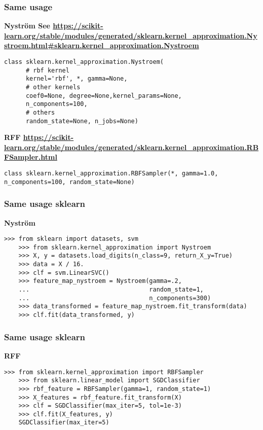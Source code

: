 \begin{frame}[fragile]
  \frametitle{Same usage}
\bf{Nyström} {\tiny See \url{https://scikit-learn.org/stable/modules/generated/sklearn.kernel\_approximation.Nystroem.html#sklearn.kernel_approximation.Nystroem}}
  \begin{lstlisting}[style=PythonStyle]
    class sklearn.kernel_approximation.Nystroem(
      # rbf kernel
      kernel='rbf', *, gamma=None, 
      # other kernels
      coef0=None, degree=None,kernel_params=None,
      n_components=100,
      # others
      random_state=None, n_jobs=None)
  \end{lstlisting}

  \bf{RFF}{ \tiny \url{https://scikit-learn.org/stable/modules/generated/sklearn.kernel_approximation.RBFSampler.html}}
  \begin{lstlisting}[style=PythonStyle]
    class sklearn.kernel_approximation.RBFSampler(*, gamma=1.0, n_components=100, random_state=None)
  \end{lstlisting}


\end{frame}


\begin{frame}[fragile]
  \frametitle{Same usage sklearn}
\bf{Nyström} 
  \begin{lstlisting}[style=PythonStyle]
    >>> from sklearn import datasets, svm
    >>> from sklearn.kernel_approximation import Nystroem
    >>> X, y = datasets.load_digits(n_class=9, return_X_y=True)
    >>> data = X / 16.
    >>> clf = svm.LinearSVC()
    >>> feature_map_nystroem = Nystroem(gamma=.2,
    ...                                 random_state=1,
    ...                                 n_components=300)
    >>> data_transformed = feature_map_nystroem.fit_transform(data)
    >>> clf.fit(data_transformed, y)
  \end{lstlisting}


\end{frame}

\begin{frame}[fragile]
  \frametitle{Same usage sklearn}

  \bf{RFF}
  \begin{lstlisting}[style=PythonStyle]
    >>> from sklearn.kernel_approximation import RBFSampler
    >>> from sklearn.linear_model import SGDClassifier
    >>> rbf_feature = RBFSampler(gamma=1, random_state=1)
    >>> X_features = rbf_feature.fit_transform(X)
    >>> clf = SGDClassifier(max_iter=5, tol=1e-3)
    >>> clf.fit(X_features, y)
    SGDClassifier(max_iter=5)
  \end{lstlisting}

\end{frame}  

